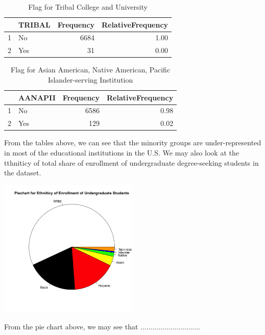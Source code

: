 \documentclass{article}\usepackage[]{graphicx}\usepackage[]{color}
\newenvironment{knitrout}{}{} %
\begin{document}
\begin{table}[ht]
\centering
\begin{tabular}{rlrr}
  \hline
 & TRIBAL & Frequency & RelativeFrequency \\ 
  \hline
1 & No & 6684 & 1.00 \\ 
  2 & Yes &  31 & 0.00 \\ 
   \hline
\end{tabular}
\caption{Flag for Tribal College and University} 
\end{table}
\begin{table}[ht]
\centering
\begin{tabular}{rlrr}
  \hline
 & AANAPII & Frequency & RelativeFrequency \\ 
  \hline
1 & No & 6586 & 0.98 \\ 
  2 & Yes & 129 & 0.02 \\ 
   \hline
\end{tabular}
\caption{Flag for Asian American, Native American, Pacific Islander-serving Institution} 
\end{table}


From the tables above, we can see that the minority groups are under-represented in most of the educational institutions in the U.S. We may also look at the tthniticy of total share of enrollment of undergraduate degree-seeking students in the dataset.

\begin{knitrout}
\color{fgcolor}

{\centering \includegraphics[width=250px]{../images/piechart-enrollmentEthnicity} 

}



\end{knitrout}

From the pie chart above, we may see that ..............................
\end{document}
